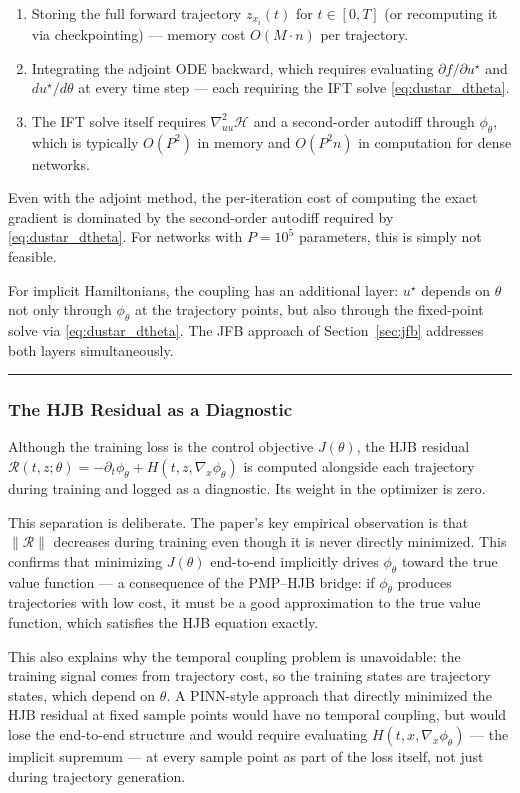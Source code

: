\documentclass{article}
\begin{document}
\begin{enumerate}
    \item Storing the full forward trajectory $z_{x_i}(t)$ for $t \in [0,T]$
          (or recomputing it via checkpointing) --- memory cost $O(M \cdot n)$
          per trajectory.
    \item Integrating the adjoint ODE backward, which requires evaluating
          $\partial f/\partial u^\star$ and $du^\star/d\theta$ at every time
          step --- each requiring the IFT solve \eqref{eq:dustar_dtheta}.
    \item The IFT solve itself requires $\nabla^2_{uu}\mathcal{H}$ and a
          second-order autodiff through $\phi_\theta$, which is typically
          $O(P^2)$ in memory and $O(P^2 n)$ in computation for dense networks.
\end{enumerate}

Even with the adjoint method, the per-iteration cost of computing the exact
gradient is dominated by the second-order autodiff required by
\eqref{eq:dustar_dtheta}. For networks with $P = 10^5$ parameters, this is
simply not feasible.

For implicit Hamiltonians, the coupling has an additional layer: $u^\star$
depends on $\theta$ not only through $\phi_\theta$ at the trajectory points,
but also through the fixed-point solve via \eqref{eq:dustar_dtheta}. The JFB
approach of Section~\ref{sec:jfb} addresses both layers simultaneously.

\medskip\hrule\medskip

\subsubsection{The HJB Residual as a Diagnostic}

\begin{extrainfobox}
Although the training loss is the control objective $J(\theta)$, the HJB
residual $\mathcal{R}(t,z;\theta) = -\partial_t\phi_\theta +
H(t,z,\nabla_x\phi_\theta)$ is computed alongside each trajectory during
training and logged as a diagnostic. Its weight in the optimizer is zero.

This separation is deliberate. The paper's key empirical observation is that
$\|\mathcal{R}\|$ decreases during training even though it is never directly
minimized. This confirms that minimizing $J(\theta)$ end-to-end implicitly
drives $\phi_\theta$ toward the true value function --- a consequence of the
PMP--HJB bridge: if $\phi_\theta$ produces trajectories with low cost, it must
be a good approximation to the true value function, which satisfies the HJB
equation exactly.

This also explains why the temporal coupling problem is unavoidable: the
training signal comes from trajectory cost, so the training states are
trajectory states, which depend on $\theta$. A PINN-style approach that
directly minimized the HJB residual at fixed sample points would have no
temporal coupling, but would lose the end-to-end structure and would require
evaluating $H(t,x,\nabla_x\phi_\theta)$ --- the implicit supremum --- at
every sample point as part of the loss itself, not just during trajectory
generation.
\end{extrainfobox}
\end{document}
